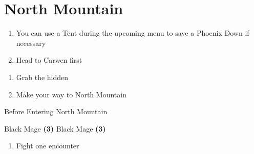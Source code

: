 \chapter{North Mountain}

\vspace{\baselineskip}

\begin{paracol}{2}
    
\begin{enumerate}
    \item You can use a Tent during the upcoming menu to save a Phoenix Down if necessary
    \item Head to Carwen first
\end{enumerate}

\resume
\begin{enumerate}[resume]
    \item Grab the hidden 
    \item Make your way to North Mountain
\end{enumerate}

\begin{menu}{Before Entering North Mountain}
	\varwb
    \begin{itemMenu}
        \potionMenu {}
    \end{itemMenu}
    \begin{jobMenu}
        \bartz Black Mage \textbf{(3\pointLeft)}
        \lenna Black Mage \textbf{(3\pointLeft)}
	\end{jobMenu}
    \varwe
\end{menu}

\resume
\vspace{0.25cm}
\begin{enumerate}[resume]
    \item Fight one encounter
\end{enumerate}


\end{paracol}
